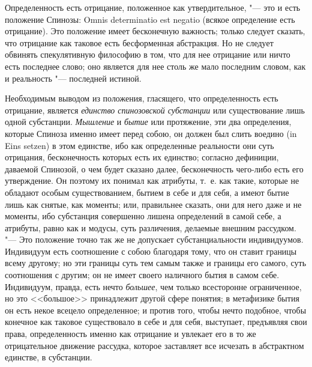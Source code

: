 Определенность есть отрицание, положенное как утвердительное, "--- это и есть
положение Спинозы: Omnis deter\-minatio est negatio (всякое определение есть
отрицание). Это положение имеет
бесконечную важность; только следует сказать, что отрицание как таковое
есть бесформенная абстракция. Но не следует обвинять спекулятивную
философию в том, что для нее отрицание или ничто есть последнее слово; оно
является для нее столь же мало последним словом, как и реальность
"--- последней истиной.

Необходимым выводом из положения, гласящего, что определенность есть
отрицание, является {\em единство спинозовской
субстанции} или существование лишь одной субстанции.
{\em Мышление} и {\em бытие} или
протяжение, эти два определения, которые Спиноза именно имеет перед собою,
он должен был слить воедино (in Eins setzen) в этом единстве, ибо как
определенные реальности они суть отрицания, бесконечность которых есть их
единство; согласно дефиниции, даваемой Спинозой, о чем будет сказано далее,
бесконечность чего-либо есть его утверждение. Он поэтому их понимал как
атрибуты, т.~е. как такие, которые не обладают особым существованием,
бытием в себе и для себя, а имеют бытие лишь как снятые, как моменты; или,
правильнее сказать, они для него даже и не моменты, ибо субстанция
совершенно лишена определений в самой себе, а атрибуты, равно как и модусы,
суть различения, делаемые внешним рассудком. "--- Это положение точно так же
не допускает субстанциальности индивидуумов. Индивидуум есть соотношение с
собою благодаря тому, что он ставит границы всему другому; но эти границы
суть тем самым также и границы его самого, суть соотношения с другим; он не
имеет своего наличного бытия в самом себе. Индивидуум, правда, есть нечто
{\em большее}, чем только всесторонне ограниченное, но
это <<большое>> принадлежит другой сфере понятия; в метафизике бытия он есть
некое всецело определенное; и против того, чтобы нечто подобное, чтобы
конечное как таковое существовало в себе и для себя, выступает, предъявляя
свои права, определенность именно как отрицание и увлекает его в то же
отрицательное движение рассудка, которое заставляет все исчезать в
абстрактном единстве, в субстанции.

